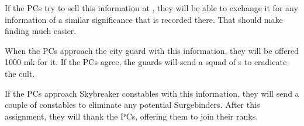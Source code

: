 If the PCs try to sell this information at \locationIndicium{}, they will be able to exchange it for any information of a similar significance that is recorded there. That should make finding \npcInformant{} much easier.

When the PCs approach the city guard with this information, they will be offered 1000 mk for it. If the PCs agree, the guards will send a squad of \enemyGuardB{}s to eradicate the cult.

If the PCs approach Skybreaker constables with this information, they will send a couple of \enemySkybreakerC{} constables to eliminate any potential Surgebinders. After this assignment, they will thank the PCs, offering them to join their ranks.


